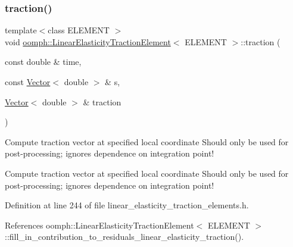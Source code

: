 \mbox{\label{classoomph_1_1LinearElasticityTractionElement_aefc580c2f9219976426f5c0b5f70ca77}} 
\subsubsection{\texorpdfstring{traction()}{traction()}}
{\footnotesize\ttfamily template$<$class E\+L\+E\+M\+E\+NT $>$ \\
void \hyperlink{classoomph_1_1LinearElasticityTractionElement}{oomph\+::\+Linear\+Elasticity\+Traction\+Element}$<$ E\+L\+E\+M\+E\+NT $>$\+::traction (\begin{DoxyParamCaption}\item[{const double \&}]{time,  }\item[{const \hyperlink{classoomph_1_1Vector}{Vector}$<$ double $>$ \&}]{s,  }\item[{\hyperlink{classoomph_1_1Vector}{Vector}$<$ double $>$ \&}]{traction }\end{DoxyParamCaption})}



Compute traction vector at specified local coordinate Should only be used for post-\/processing; ignores dependence on integration point! 

Compute traction vector at specified local coordinate Should only be used for post-\/processing; ignores dependence on integration point! 

Definition at line 244 of file linear\+\_\+elasticity\+\_\+traction\+\_\+elements.\+h.



References oomph\+::\+Linear\+Elasticity\+Traction\+Element$<$ E\+L\+E\+M\+E\+N\+T $>$\+::fill\+\_\+in\+\_\+contribution\+\_\+to\+\_\+residuals\+\_\+linear\+\_\+elasticity\+\_\+traction().

\mbox{\label{classoomph_1_1LinearElasticityTractionElement_a1e9b037926aad0682fd195bb5a9d4f55}} 
